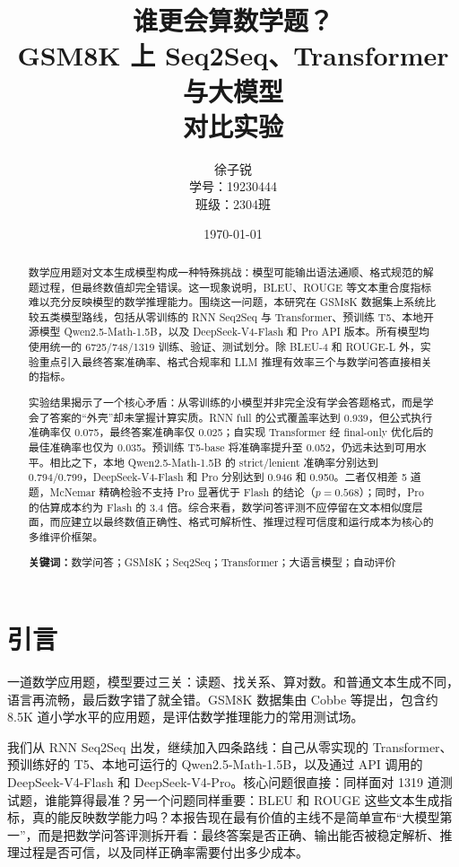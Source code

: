 \documentclass[UTF8,a4paper,zihao=-4]{ctexart}
\title{\heiti 谁更会算数学题？\\[0.4em]GSM8K 上 Seq2Seq、Transformer 与大模型\\对比实验}
\author{徐子锐\\学号：19230444\\班级：2304班}
\date{\today}
\begin{document}
\maketitle

\begin{abstract}
数学应用题对文本生成模型构成一种特殊挑战：模型可能输出语法通顺、格式规范的解题过程，但最终数值却完全错误。这一现象说明，BLEU、ROUGE 等文本重合度指标难以充分反映模型的数学推理能力。围绕这一问题，本研究在 GSM8K 数据集上系统比较五类模型路线，包括从零训练的 RNN Seq2Seq 与 Transformer、预训练 T5、本地开源模型 Qwen2.5-Math-1.5B，以及 DeepSeek-V4-Flash 和 Pro API 版本。所有模型均使用统一的 6725/748/1319 训练、验证、测试划分。除 BLEU-4 和 ROUGE-L 外，实验重点引入最终答案准确率、格式合规率和 LLM 推理有效率三个与数学问答直接相关的指标。

实验结果揭示了一个核心矛盾：从零训练的小模型并非完全没有学会答题格式，而是学会了答案的“外壳”却未掌握计算实质。RNN full 的公式覆盖率达到 0.939，但公式执行准确率仅 0.075，最终答案准确率仅 0.025；自实现 Transformer 经 final-only 优化后的最佳准确率也仅为 0.035。预训练 T5-base 将准确率提升至 0.052，仍远未达到可用水平。相比之下，本地 Qwen2.5-Math-1.5B 的 strict/lenient 准确率分别达到 0.794/0.799，DeepSeek-V4-Flash 和 Pro 分别达到 0.946 和 0.950。二者仅相差 5 道题，McNemar 精确检验不支持 Pro 显著优于 Flash 的结论（$p=0.568$）；同时，Pro 的估算成本约为 Flash 的 3.4 倍。综合来看，数学问答评测不应停留在文本相似度层面，而应建立以最终数值正确性、格式可解析性、推理过程可信度和运行成本为核心的多维评价框架。

\textbf{关键词：}数学问答；GSM8K；Seq2Seq；Transformer；大语言模型；自动评价
\end{abstract}

\section{引言}

一道数学应用题，模型要过三关：读题、找关系、算对数。和普通文本生成不同，语言再流畅，最后数字错了就全错。GSM8K 数据集由 Cobbe 等提出，包含约 8.5K 道小学水平的应用题，是评估数学推理能力的常用测试场\cite{cobbe2021gsm8k}。

我们从 RNN Seq2Seq 出发，继续加入四条路线：自己从零实现的 Transformer、预训练好的 T5、本地可运行的 Qwen2.5-Math-1.5B，以及通过 API 调用的 DeepSeek-V4-Flash 和 DeepSeek-V4-Pro。核心问题很直接：同样面对 1319 道测试题，谁能算得最准？另一个问题同样重要：BLEU 和 ROUGE 这些文本生成指标，真的能反映数学能力吗？本报告现在最有价值的主线不是简单宣布“大模型第一”，而是把数学问答评测拆开看：最终答案是否正确、输出能否被稳定解析、推理过程是否可信，以及同样正确率需要付出多少成本。
\end{document}
